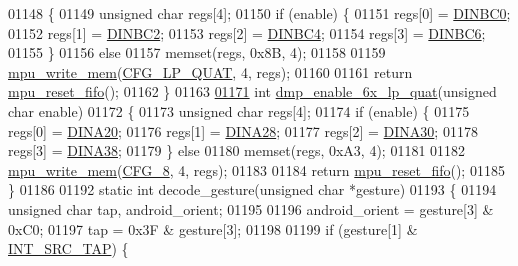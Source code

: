 \begin{DoxyCode}
01148 \{
01149     \textcolor{keywordtype}{unsigned} \textcolor{keywordtype}{char} regs[4];
01150     \textcolor{keywordflow}{if} (enable) \{
01151         regs[0] = \hyperlink{dmp_key_8h_a0ab58ef64f279a76d1f1be67616cf579}{DINBC0};
01152         regs[1] = \hyperlink{dmp_key_8h_a9e426a02a039b5e6c2e1d641077af3e9}{DINBC2};
01153         regs[2] = \hyperlink{dmp_key_8h_aa9e0a837de04950e42f00e074c3d6566}{DINBC4};
01154         regs[3] = \hyperlink{dmp_key_8h_a0677bcabb419e066434b7163a109d9a1}{DINBC6};
01155     \}
01156     \textcolor{keywordflow}{else}
01157         memset(regs, 0x8B, 4);
01158 
01159     \hyperlink{group___d_r_i_v_e_r_s_gafea59910bc3dd30ba3356b1c75213a5f}{mpu\_write\_mem}(\hyperlink{group___d_r_i_v_e_r_s_gadf5652e51b8c08c2eb6a902d1d1f319c}{CFG\_LP\_QUAT}, 4, regs);
01160 
01161     \textcolor{keywordflow}{return} \hyperlink{group___d_r_i_v_e_r_s_gaf23e9f57c0059be6ec57862f0584de10}{mpu\_reset\_fifo}();
01162 \}
01163 
\hypertarget{inv__mpu__dmp__motion__driver_8c_source.tex_l01171}{}\hyperlink{group___d_r_i_v_e_r_s_gaac712ef33727433f666b3861894873be}{01171} \textcolor{keywordtype}{int} \hyperlink{group___d_r_i_v_e_r_s_gaac712ef33727433f666b3861894873be}{dmp\_enable\_6x\_lp\_quat}(\textcolor{keywordtype}{unsigned} \textcolor{keywordtype}{char} enable)
01172 \{
01173     \textcolor{keywordtype}{unsigned} \textcolor{keywordtype}{char} regs[4];
01174     \textcolor{keywordflow}{if} (enable) \{
01175         regs[0] = \hyperlink{dmp_key_8h_a2b6f6c9e544536e4c10f2a828621b87b}{DINA20};
01176         regs[1] = \hyperlink{dmp_key_8h_a9bf039b1ae9e7538e239094efd52ccac}{DINA28};
01177         regs[2] = \hyperlink{dmp_key_8h_a36e38090f76b423468d88f275b02b8bb}{DINA30};
01178         regs[3] = \hyperlink{dmp_key_8h_ab904b6b28e9710721475f247140ec7aa}{DINA38};
01179     \} \textcolor{keywordflow}{else}
01180         memset(regs, 0xA3, 4);
01181 
01182     \hyperlink{group___d_r_i_v_e_r_s_gafea59910bc3dd30ba3356b1c75213a5f}{mpu\_write\_mem}(\hyperlink{group___d_r_i_v_e_r_s_ga3dc0e5c81e361fb871fbf63eeba82520}{CFG\_8}, 4, regs);
01183 
01184     \textcolor{keywordflow}{return} \hyperlink{group___d_r_i_v_e_r_s_gaf23e9f57c0059be6ec57862f0584de10}{mpu\_reset\_fifo}();
01185 \}
01186 
01192 \textcolor{keyword}{static} \textcolor{keywordtype}{int} decode\_gesture(\textcolor{keywordtype}{unsigned} \textcolor{keywordtype}{char} *gesture)
01193 \{
01194     \textcolor{keywordtype}{unsigned} \textcolor{keywordtype}{char} tap, android\_orient;
01195 
01196     android\_orient = gesture[3] & 0xC0;
01197     tap = 0x3F & gesture[3];
01198 
01199     \textcolor{keywordflow}{if} (gesture[1] & \hyperlink{group___d_r_i_v_e_r_s_gac5690dcf21f75f38bc3ea13ad4799714}{INT\_SRC\_TAP}) \{

\end{DoxyCode}
